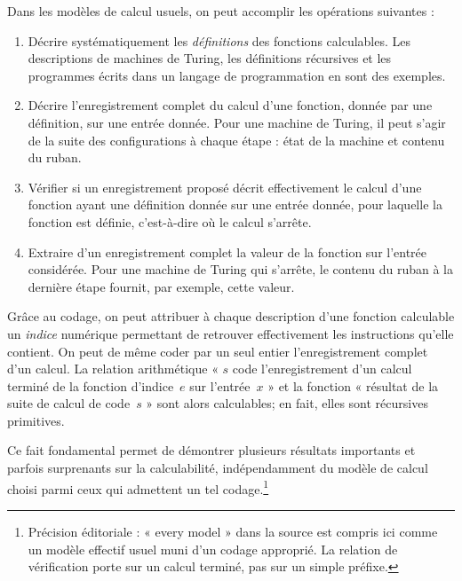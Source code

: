 \documentclass[../../../include/open-logic-section]{subfiles}
\begin{document}

Dans les modèles de calcul usuels, on peut accomplir
les opérations suivantes :
\begin{enumerate}
\item Décrire systématiquement les \emph{définitions}
  des fonctions calculables. Les descriptions de machines
  de Turing, les définitions récursives et les programmes
  écrits dans un langage de programmation en sont des exemples.
\item Décrire l'enregistrement complet du calcul d'une
  fonction, donnée par une définition, sur une entrée
  donnée. Pour une machine de Turing, il peut s'agir de
  la suite des configurations à chaque étape : état
  de la machine et contenu du ruban.
\item Vérifier si un enregistrement proposé décrit
  effectivement le calcul d'une fonction ayant une
  définition donnée sur une entrée donnée, pour laquelle
  la fonction est définie, c'est-à-dire où le calcul s'arrête.
\item Extraire d'un enregistrement complet la valeur de
  la fonction sur l'entrée considérée. Pour une machine
  de Turing qui s'arrête, le contenu du ruban à la
  dernière étape fournit, par exemple, cette valeur.
\end{enumerate}

Grâce au codage, on peut attribuer à chaque description
d'une fonction calculable un \emph{indice} numérique
permettant de retrouver effectivement les instructions
qu'elle contient. On peut de même coder par un seul
entier l'enregistrement complet d'un calcul. La relation
arithmétique « $s$ code l'enregistrement d'un calcul terminé de
la fonction d'indice~$e$ sur l'entrée~$x$ » et la
fonction « résultat de la suite de calcul de code~$s$ »
sont alors calculables; en fait, elles sont récursives
primitives.

Ce fait fondamental permet de démontrer plusieurs résultats
importants et parfois surprenants sur la calculabilité,
indépendamment du modèle de calcul choisi parmi ceux
qui admettent un tel codage.\footnote{Précision éditoriale : « every model » dans la source est compris ici comme un modèle effectif usuel muni d'un codage approprié. La relation de vérification porte sur un calcul terminé, pas sur un simple préfixe.}
\end{document}
